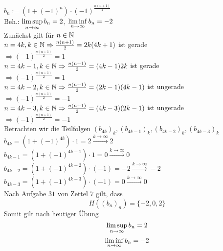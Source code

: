 \documentclass[../ana1u.tex]{subfiles}
\begin{document}
\begin{bsp}
    \(b_n := (1 + (-1)^n) \cdot (-1)^{\frac{n(n+1)}{2}} \) \\
    Beh.: \(\limsup\limits_{n\rightarrow\infty} b_n = 2\), \(\liminf\limits_{n\rightarrow\infty} b_n = -2 \) \\
    Zunächst gilt für \(n \in \mathbb{N} \) \\
    \(n = 4k, k \in \mathbb{N} \Rightarrow \frac{n(n+1)}{2} = 2k(4k+1) \) ist gerade \\
    \(\Rightarrow (-1)^{\frac{n(n+1)}{2}} = 1\)\\
    \(n = 4k - 1, k \in \mathbb{N} \Rightarrow \frac{n(n+1)}{2} = (4k-1)2k \) ist gerade \\
    \(\Rightarrow (-1)^{\frac{n(n+1)}{2}} = 1\)\\
    \(n = 4k - 2, k \in \mathbb{N} \Rightarrow \frac{n(n+1)}{2} = (2k-1)(4k-1) \) ist ungerade \\
    \(\Rightarrow (-1)^{\frac{n(n+1)}{2}} = -1\)\\
    \(n = 4k - 3, k \in \mathbb{N} \Rightarrow \frac{n(n+1)}{2} = (4k-3)(2k-1) \) ist ungerade \\
    \(\Rightarrow (-1)^{\frac{n(n+1)}{2}} = -1 \) \\
    Betrachten wir die Teilfolgen \((b_{4k})_k, (b_{4k-1})_k, (b_{4k-2})_k, (b_{4k-3})_k \) \\
    \(b_{4k} = (1 + (-1)^{4k}) \cdot 1 = 2 \overset{k \rightarrow \infty}{\rightarrow} 2 \) \\
    \(b_{4k-1} = (1 + (-1)^{4k-1}) \cdot 1 
    = 0 \overset{k \rightarrow \infty}{\rightarrow} 0 \) \\
    \(b_{4k-2} = (1 + (-1)^{4k-2}) \cdot (-1) 
    = -2 \overset{k \rightarrow \infty}{\rightarrow} -2 \) \\
    \(b_{4k-3} = (1 + (-1)^{4k-3}) \cdot (-1) = 0 \overset{k \rightarrow \infty}{\rightarrow} 0 \) \\
    Nach Aufgabe \(31 \) von Zettel \(7 \) gilt, dass
    \[H((b_n)_n) = \{-2,0,2\} \]
    Somit gilt nach heutiger Übung
    \[\limsup\limits_{n\rightarrow\infty} b_n = 2\]
    \[\liminf\limits_{n\rightarrow\infty} b_n = -2\]
\end{bsp}
\end{document}
